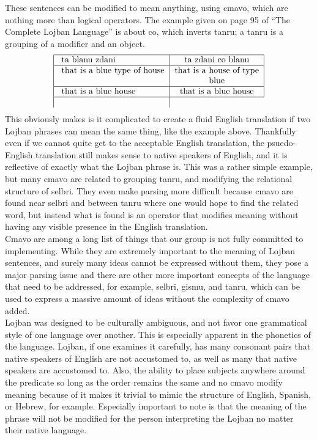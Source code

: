\documentclass[11pt,letterpaper]{article}
\begin{document}
	These sentences can be modified to mean anything, using cmavo, which are nothing more than logical operators. The example given on page 95 of “The Complete Lojban Language” is about co, which inverts tanru; a tanru is a grouping of a modifier and an object.\\
\[
\begin{tabular}{|l|c|r|}
\hline{}
ta blanu zdani &ta zdani co blanu\\
\hline{}
that is a blue type of house & that is a house of type\\
 & blue\\
\hline{}
that is a blue house & that is a blue house \\
\hline{}
\end{tabular}
\]
This obviously makes is it complicated to create a fluid English translation if two Lojban phrases can mean the same thing, like the example above. Thankfully even if we cannot quite get to the acceptable English translation, the psuedo-English translation still makes sense to native speakers of English, and it is reflective of exactly what the Lojban phrase is. This was a rather simple example, but many cmavo are related to grouping tanru, and modifying the relational structure of selbri. They even make parsing more difficult because cmavo are found near selbri and between tanru where one would hope to find the related word, but instead what is found is an operator that modifies meaning without having any visible presence in the English translation. \\

	Cmavo are among a long list of things that our group is not fully committed to implementing. While they are extremely important to the meaning of Lojban sentences, and surely many ideas cannot be expressed without them, they pose a major parsing issue and there are other more important concepts of the language that need to be addressed, for example, selbri, gismu, and tanru, which can be used to express a massive amount of ideas without the complexity of cmavo added. \\

Lojban was designed to be culturally ambiguous, and not favor one grammatical style of one language over another. This is especially apparent in the phonetics of the language. Lojban, if one examines it carefully, has many consonant pairs that native speakers of English are not accustomed to, as well as many that native speakers are accustomed to. Also, the ability to place subjects anywhere around the predicate so long as the order remains the same and no cmavo modify meaning because of it makes it trivial to mimic the structure of English, Spanish, or Hebrew, for example. Especially important to note is that the meaning of the phrase will not be modified for the person interpreting the Lojban no matter their native language. \\
\end{document}
